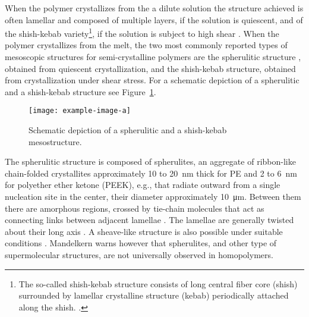 When the polymer crystallizes from the a dilute solution the structure achieved is often lamellar and composed of multiple layers, if the solution is quiescent, and of the shish-kebab variety\footnote{The so-called shish-kebab structure consists of long central fiber core (shish) surrounded by lamellar crystalline structure (kebab) periodically attached along the shish.
\citep{naViscousForceDominatedTensileDeformation2006, peacockHandbookPolyethyleneStructures2014}.}, if the solution is subject to high shear \citep{khouryMorphologyCrystallineSynthetic1976, callister2014materials, peacockHandbookPolyethyleneStructures2014}.
When the polymer crystallizes from the melt, the two most commonly reported types of mesoscopic structures for semi-crystalline polymers are the spherulitic structure \citep{zengConstitutiveModelSemicrystalline2010}, obtained from quiescent crystallization, and the shish-kebab structure, obtained from crystallization under shear stress.
For a schematic depiction of a spherulitic and a shish-kebab structure see Figure~\ref{fig:mesostructure_scp}.
\begin{figure}[hbtp]
	\texttt{[image: example-image-a]}
	\caption{Schematic depiction of a spherulitic and a shish-kebab mesostructure.}
\label{fig:mesostructure_scp}
\end{figure}

The spherulitic structure is composed of spherulites, an aggregate of ribbon-like chain-folded crystallites approximately 10 to \SI{20}{\nano\meter} thick for PE and 2 to \SI{6}{\nano\meter} for polyether ether ketone (PEEK), e.g., that radiate outward from a single nucleation site in the center, their diameter approximately \SI{10}{\micro\meter}.
Between them there are amorphous regions, crossed by tie-chain molecules that act as connecting links between adjacent lamellae \citep{callister2014materials, khouryMorphologyCrystallineSynthetic1976, pouriayevaliConstitutiveDescriptionRatesensitive2013, gsellEvolutionMicrostructureSemicrystalline1994}.
The lamellae are generally twisted about their long axis \citep{patlazhanStructuralMechanicsSemicrystalline2012}.
A sheave-like structure is also possible under suitable conditions \citep{peacockHandbookPolyethyleneStructures2014}.
Mandelkern \citep{mandelkernCrystallinePolymerReminiscences2006} warns however that spherulites, and other type of supermolecular structures, are not universally observed in homopolymers.

